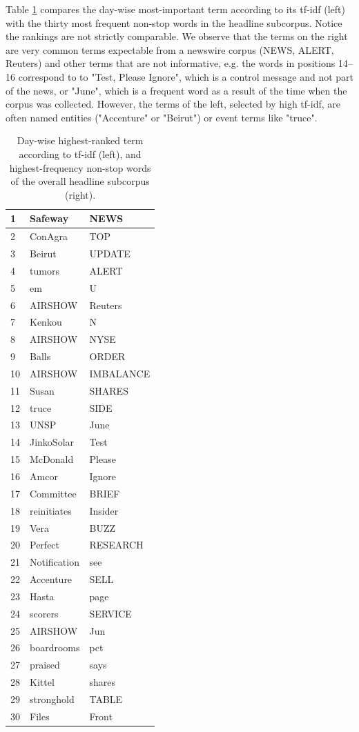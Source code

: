 \documentclass[12pt]{article}%
\begin{document}
Table \ref{tbl:tfidf} compares the day-wise most-important term according to its tf-idf (left) with the thirty most frequent non-stop words in the headline subcorpus. Notice the rankings are not strictly comparable. We observe that the terms on the right are very common terms expectable from a newswire corpus (NEWS, ALERT, Reuters) and other terms that are not informative, e.g. the words in positions 14--16 correspond to to "Test, Please Ignore", which is a control message and not part of the news, or "June", which is a frequent word as a result of the time when the corpus was collected. However, the terms of the left, selected by high tf-idf, are often named entities ("Accenture" or "Beirut") or event terms like "truce".
\begin{table}
\center
\begin{tabular}{|ll|l|}
\hline 
1 & Safeway & NEWS \\ \hline
2 & ConAgra & TOP \\ \hline
3 & Beirut & UPDATE \\ \hline
4 & tumors & ALERT \\ \hline
5 & em & U \\ \hline
6 & AIRSHOW & Reuters \\ \hline
7 & Kenkou & N \\ \hline
8 & AIRSHOW & NYSE \\ \hline
9 & Balls & ORDER \\ \hline
10 & AIRSHOW & IMBALANCE \\ \hline
11 & Susan & SHARES \\ \hline
12 & truce & SIDE \\ \hline
13 & UNSP & June \\ \hline
14 & JinkoSolar & Test \\ \hline
15 & McDonald & Please \\ \hline
16 & Amcor & Ignore \\ \hline
17 & Committee & BRIEF \\ \hline
18 & reinitiates & Insider \\ \hline
19 & Vera & BUZZ \\ \hline
20 & Perfect & RESEARCH \\ \hline
21 & Notification & see \\ \hline
22 & Accenture & SELL \\ \hline
23 & Hasta & page \\ \hline
24 & scorers & SERVICE \\ \hline
25 & AIRSHOW & Jun \\ \hline
26 & boardrooms & pct \\ \hline
27 & praised & says \\ \hline
28 & Kittel & shares \\ \hline
29 & stronghold & TABLE \\ \hline
30 & Files & Front \\ \hline

\end{tabular} 
\caption {Day-wise highest-ranked term according to tf-idf (left), and highest-frequency non-stop words of the overall headline subcorpus (right).\label{tbl:tfidf}}
\end{table}
\end{document}
